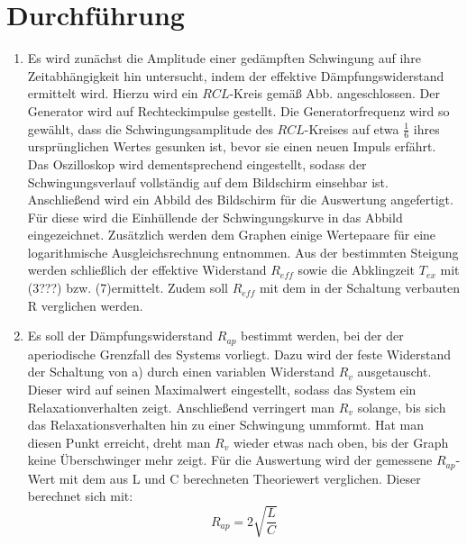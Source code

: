 \section{Durchführung}
\label{sec:Durchführung}
\renewcommand{\labelenumi}{\alph{enumi})}
\begin{enumerate}
\item Es wird zunächst die Amplitude einer gedämpften Schwingung auf ihre Zeitabhängigkeit hin untersucht, indem
 der effektive Dämpfungswiderstand ermittelt wird. Hierzu wird ein $RCL$-Kreis gemäß
 Abb.  angeschlossen. Der Generator wird auf Rechteckimpulse gestellt.
  Die Generatorfrequenz wird so gewählt, dass die Schwingungsamplitude des $RCL$-Kreises auf etwa $\frac{1}{6}$
   ihres ursprünglichen Wertes gesunken ist, bevor sie einen neuen Impuls erfährt. Das Oszilloskop
    wird dementsprechend eingestellt, sodass der Schwingungsverlauf vollständig auf dem Bildschirm einsehbar ist.
    Anschließend wird ein Abbild des Bildschirm für die Auswertung angefertigt.
    Für diese wird die Einhüllende der Schwingungskurve in das Abbild eingezeichnet.
     Zusätzlich werden dem Graphen einige Wertepaare für eine logarithmische Ausgleichsrechnung entnommen.
      Aus der bestimmten Steigung werden schließlich der effektive Widerstand $R_{eff}$ sowie die Abklingzeit $T_{ex}$  mit (3???) bzw. (7)ermittelt.
       Zudem soll $R_{eff}$ mit dem in der Schaltung verbauten R verglichen werden.

     \item Es soll der Dämpfungswiderstand $R_{ap}$ bestimmt werden, bei der der aperiodische Grenzfall des Systems vorliegt.
     Dazu wird der feste Widerstand der Schaltung von a) durch einen variablen Widerstand $R_v$
     ausgetauscht. Dieser wird auf seinen Maximalwert eingestellt, sodass das System ein Relaxationverhalten zeigt.
      Anschließend verringert man $R_v$ solange, bis sich das Relaxationsverhalten hin zu einer Schwingung ummformt.
      Hat man diesen Punkt erreicht, dreht man $R_v$ wieder etwas nach oben, bis der Graph keine Überschwinger mehr zeigt.
      Für die Auswertung wird der gemessene $R_{ap}$-Wert mit dem aus L und C berechneten Theoriewert verglichen.
       Dieser berechnet sich mit:
       \begin{equation}
         R_{ap} = 2\sqrt{\frac{L}{C}}
       \end{equation}


\end{enumerate}
